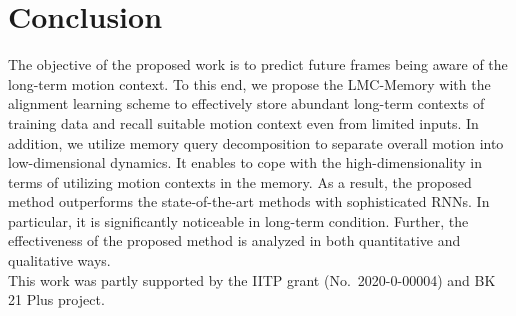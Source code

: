 \documentclass[final]{cvpr}
\begin{document}
\section{Conclusion}
The objective of the proposed work is to predict future frames being aware of the long-term motion context. To this end, we propose the LMC-Memory with the alignment learning scheme to effectively store abundant long-term contexts of training data and recall suitable motion context even from limited inputs. In addition, we utilize memory query decomposition to separate overall motion into low-dimensional dynamics. It enables to cope with the high-dimensionality in terms of utilizing motion contexts in the memory. As a result, the proposed method outperforms the state-of-the-art methods with sophisticated RNNs. In particular, it is significantly noticeable in long-term condition. Further, the effectiveness of the proposed method is analyzed in both quantitative and qualitative ways. \vspace{0.17cm}\\
This work was partly supported by the IITP grant (No.\ 2020-0-00004) and BK 21 Plus project.

{\small


}
\end{document}
